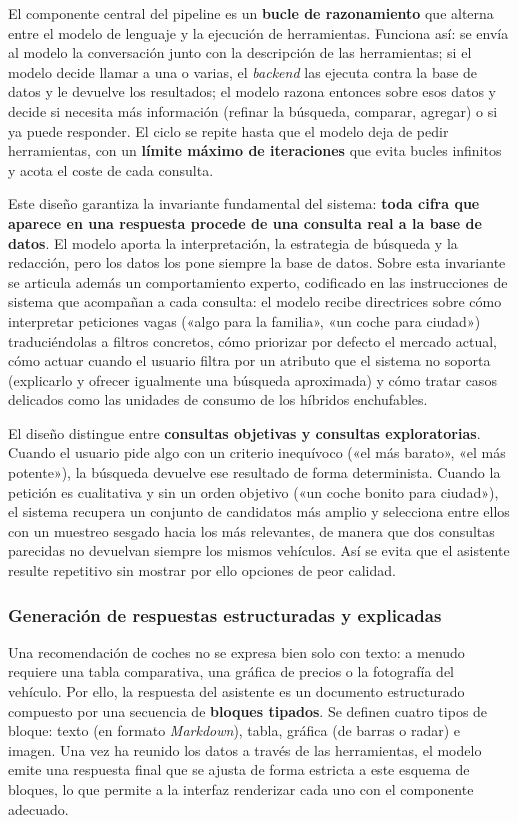 El componente central del pipeline es un \textbf{bucle de razonamiento} que
alterna entre el modelo de lenguaje y la ejecución de herramientas. Funciona así:
se envía al modelo la conversación junto con la descripción de las herramientas;
si el modelo decide llamar a una o varias, el \emph{backend} las ejecuta contra
la base de datos y le devuelve los resultados; el modelo razona entonces sobre
esos datos y decide si necesita más información (refinar la búsqueda, comparar,
agregar) o si ya puede responder. El ciclo se repite hasta que el modelo deja de
pedir herramientas, con un \textbf{límite máximo de iteraciones} que evita bucles
infinitos y acota el coste de cada consulta.

Este diseño garantiza la invariante fundamental del sistema: \textbf{toda cifra
que aparece en una respuesta procede de una consulta real a la base de datos}.
El modelo aporta la interpretación, la estrategia de búsqueda y la redacción,
pero los datos los pone siempre la base de datos. Sobre esta invariante se
articula además un comportamiento experto, codificado en las instrucciones de
sistema que acompañan a cada consulta: el modelo recibe directrices sobre cómo
interpretar peticiones vagas («algo para la familia», «un coche para ciudad»)
traduciéndolas a filtros concretos, cómo priorizar por defecto el mercado actual,
cómo actuar cuando el usuario filtra por un atributo que el sistema no soporta
(explicarlo y ofrecer igualmente una búsqueda aproximada) y cómo tratar casos
delicados como las unidades de consumo de los híbridos enchufables.

El diseño distingue entre \textbf{consultas objetivas y consultas
exploratorias}. Cuando el usuario pide algo con un criterio inequívoco («el más
barato», «el más potente»), la búsqueda devuelve ese resultado de forma
determinista. Cuando la petición es cualitativa y sin un orden objetivo («un
coche bonito para ciudad»), el sistema recupera un conjunto de candidatos más
amplio y selecciona entre ellos con un muestreo sesgado hacia los más
relevantes, de manera que dos consultas parecidas no devuelvan siempre los mismos
vehículos. Así se evita que el asistente resulte repetitivo sin mostrar por ello
opciones de peor calidad.

\subsubsection*{Generación de respuestas estructuradas y explicadas}

Una recomendación de coches no se expresa bien solo con texto: a menudo requiere
una tabla comparativa, una gráfica de precios o la fotografía del vehículo. Por
ello, la respuesta del asistente es un documento estructurado compuesto por una
secuencia de \textbf{bloques tipados}. Se definen cuatro tipos de bloque: texto
(en formato \emph{Markdown}), tabla, gráfica (de barras o radar) e imagen. Una
vez ha reunido los datos a través de las herramientas, el modelo emite una
respuesta final que se ajusta de forma estricta a este esquema de bloques, lo que
permite a la interfaz renderizar cada uno con el componente adecuado.

